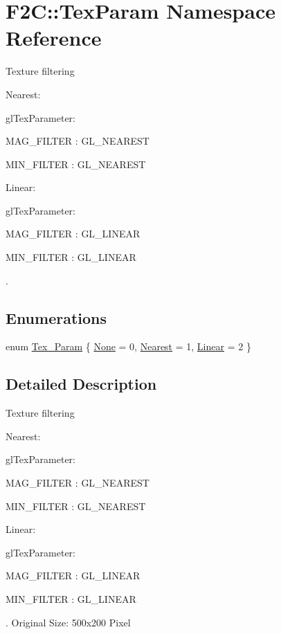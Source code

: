 \hypertarget{namespace_f2_c_1_1_tex_param}{
\section{F2C::TexParam Namespace Reference}
\label{namespace_f2_c_1_1_tex_param}
}


Texture filtering \par
 Nearest: \par
 glTexParameter: \par
 MAG\_\-FILTER : GL\_\-NEAREST \par
 MIN\_\-FILTER : GL\_\-NEAREST \par
 \par
 Linear: \par
 glTexParameter: \par
 MAG\_\-FILTER : GL\_\-LINEAR \par
 MIN\_\-FILTER : GL\_\-LINEAR \par
 \par
.  
\subsection*{Enumerations}
\begin{DoxyCompactItemize}
\item 
enum \hyperlink{namespace_f2_c_1_1_tex_param_a64299c3972944468af4e8b0394c936c6}{Tex\_\-Param} \{ \hyperlink{namespace_f2_c_1_1_tex_param_a64299c3972944468af4e8b0394c936c6aca6170cd53032a5477e3c636e400c6ff}{None} =  0, 
\hyperlink{namespace_f2_c_1_1_tex_param_a64299c3972944468af4e8b0394c936c6a24ebbb7dc474946d5c959d8c4a34e3f1}{Nearest} =  1, 
\hyperlink{namespace_f2_c_1_1_tex_param_a64299c3972944468af4e8b0394c936c6ab324773649bec041f907ab81581a53bf}{Linear} =  2
 \}
\end{DoxyCompactItemize}


\subsection{Detailed Description}
Texture filtering \par
 Nearest: \par
 glTexParameter: \par
 MAG\_\-FILTER : GL\_\-NEAREST \par
 MIN\_\-FILTER : GL\_\-NEAREST \par
 \par
 Linear: \par
 glTexParameter: \par
 MAG\_\-FILTER : GL\_\-LINEAR \par
 MIN\_\-FILTER : GL\_\-LINEAR \par
 \par
.  Original Size: 500x200 Pixel \par
 

